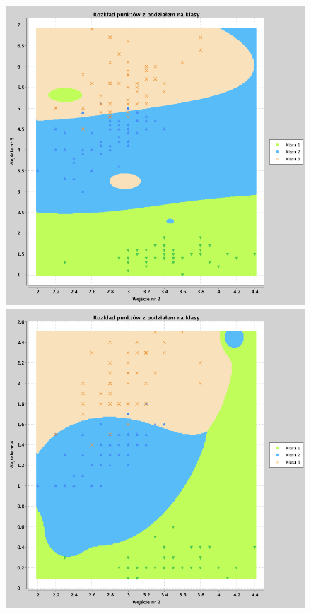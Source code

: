 \documentclass[a4paper, portrait,11pt]{article}
\begin{document}
\begin{figure}[!htb]
  \begin{minipage}{0.33\textwidth}
    \centering
    \includegraphics[width=1\linewidth]{../data/classification4/3/derivatives/2_2,3.png}
    \caption{\label{fig:43_2_2,3derivative}}
  \end{minipage}
  \begin{minipage}{0.33\textwidth}
    \centering
    \includegraphics[width=1\linewidth]{../data/classification4/3/derivatives/2_2,4.png}

\end{minipage}
\end{figure}
\end{document}
